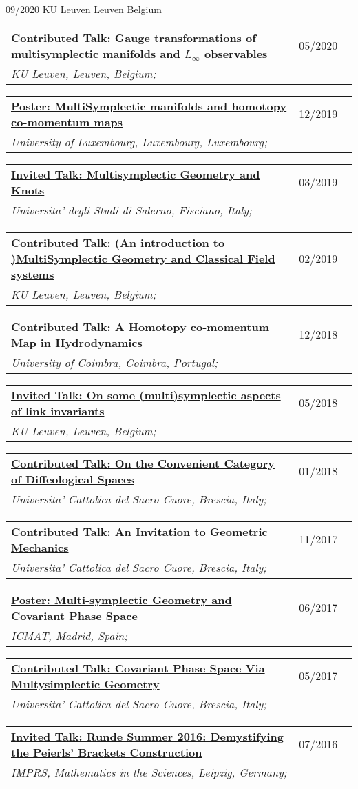 \documentclass[a4paper]{article}
\newcommand{\longvoice}[8]{
	\begin{tabular}{p{0.83\linewidth} p{0.17\linewidth} }
		\textbf{\href{#3}{#2: #1}} & #4 
		\\ 
		\textit{#5, #6, #7;} & {\small\emph{#8}}
	\end{tabular}
	\vspace{.5em}
}
\begin{document}
		{09/2020}
		{KU Leuven}
		{Leuven}
		{Belgium}
		{}
	\longvoice{Gauge transformations of multisymplectic manifolds and $L_\infty$ observables}
		{Contributed Talk}
		{https://www.researchgate.net/publication/344044689_Gauge_transformations_of_multisymplectic_manifolds_and_L_infinity_observables}
		{05/2020}
		{KU Leuven}
		{Leuven}
		{Belgium}
		{}
	\longvoice{MultiSymplectic manifolds and homotopy co-momentum maps}
		{Poster}
		{https://www.researchgate.net/publication/338019063_Multisymplectic_manifolds_and_Homotopy_co-momentum_maps}
		{12/2019}
		{University of Luxembourg}
		{Luxembourg}
		{Luxembourg}
		{}
	\longvoice{Multisymplectic Geometry and Knots}
		{Invited Talk}
		{https://www.researchgate.net/publication/331939491_Multisymplectic_aspects_of_link_invariants}
		{03/2019}
		{Universita' degli Studi di Salerno}
		{Fisciano}
		{Italy}
		{}
	\longvoice{(An introduction to )MultiSymplectic Geometry and Classical Field systems}
		{Contributed Talk}
		{https://www.dropbox.com/s/q68uv6hbbej8d09/1902-Talk-MultisymplecticFields.pdf?dl=0}
		{02/2019}
		{KU Leuven}
		{Leuven}
		{Belgium}
		{}
	\longvoice{A Homotopy co-momentum Map in Hydrodynamics}
		{Contributed Talk}
		{https://www.researchgate.net/publication/329572409_Homotopy_co-momentum_Map_in_Hydrodynamics}
		{12/2018}
		{University of Coimbra}
		{Coimbra}
		{Portugal}
		{}
	\longvoice{On some (multi)symplectic aspects of link invariants}
		{Invited Talk}
		{https://web.archive.org/web/20180424133109/https://wis.kuleuven.be/agenda/sem-geometry/academic-year-2017-2018/seminar_differential_geometry_Miti}
		{05/2018}
		{KU Leuven}
		{Leuven}
		{Belgium}
		{}
	\longvoice{On the Convenient Category of Diffeological Spaces}
		{Contributed Talk}
		{https://www.dropbox.com/s/thm6unntpduynh3/1801-Talk-ConvenientDiffeological.pdf?dl=0}
		{01/2018}
		{Universita' Cattolica del Sacro Cuore}
		{Brescia}
		{Italy}
		{}
	\longvoice{An Invitation to Geometric Mechanics}
		{Contributed Talk}
		{https://www.dropbox.com/s/k066hn2ubovhaop/1711-talk-invitationGeoMec.pdf?dl=0}
		{11/2017}
		{Universita' Cattolica del Sacro Cuore}
		{Brescia}
		{Italy}
		{}
	\longvoice{Multi-symplectic Geometry and Covariant Phase Space}
		{Poster}
		{https://www.researchgate.net/publication/319301416_Multi-symplectic_Geometry_and_Covariant_Phase_Space}
		{06/2017}
		{ICMAT}
		{Madrid}
		{Spain}
		{}
	\longvoice{Covariant Phase Space Via Multysimplectic Geometry}
		{Contributed Talk}
		{https://www.researchgate.net/publication/319301194_Notes_on_Covariant_Phase_Space_via_MultiSymplectic_Geometry}
		{05/2017}
		{Universita' Cattolica del Sacro Cuore}
		{Brescia}
		{Italy}
		{}
	\longvoice{Runde Summer 2016: Demystifying the Peierls' Brackets Construction}
		{Invited Talk}
		{https://www.dropbox.com/s/slk28t877e2nxtq/1607-Liepzig-RundeSummer.PDF?dl=0}
		{07/2016}
		{IMPRS, Mathematics in the Sciences}
		{Leipzig}
		{Germany}
		{}
\end{document}
